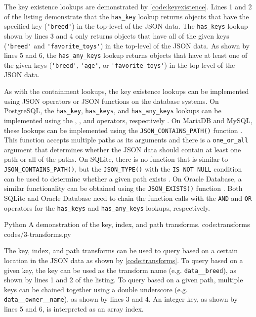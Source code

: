 The key existence lookups are demonstrated by \autoref{code:keyexistence}.
Lines 1 and 2 of the listing demonstrate that the \verb|has_key| lookup
returns objects that have the specified key (\verb|'breed'|) in the top-level
of the JSON data. The \verb|has_keys| lookup shown by lines 3 and 4 only
returns objects that have all of the given keys (\verb|'breed'| and
\verb|'favorite_toys'|) in the top-level of the JSON data. As shown by lines 5
and 6, the \verb|has_any_keys| lookup returns objects that have at least one
of the given keys (\verb|'breed'|, \verb|'age'|, or \verb|'favorite_toys'|) in
the top-level of the JSON data.

As with the containment lookups, the key existence lookups can be implemented
using JSON operators or JSON functions on the database systems. On PostgreSQL,
the \verb|has_key|, \verb|has_keys|, and \verb|has_any_keys| lookups can be
implemented using the , , and  operators,
respectively \cite{postgres:json_operators}. On MariaDB and MySQL, these
lookups can be implemented using the \verb|JSON_CONTAINS_PATH()| function
\cite{mariadb:json_contains_path, mysql:json_search}. This function accepts
multiple paths as its arguments and there is a \verb|one_or_all| argument that
determines whether the JSON data should contain at least one path or all of the
paths. On SQLite, there is no function that is similar to
\verb|JSON_CONTAINS_PATH()|, but the \verb|JSON_TYPE()| with the
\verb|IS NOT NULL| condition can be used to determine whether a given path
exists \cite{sqlite:json1}. On Oracle Database, a similar functionality can be
obtained using the \verb|JSON_EXISTS()| function \cite{oracle:json_exists}. Both
SQLite and Oracle Database need to chain the function calls with the \verb|AND|
and \verb|OR| operators for the \verb|has_keys| and \verb|has_any_keys|
lookups, respectively.

\listing
{Python}
{A demonstration of the key, index, and path transforms.}
{code:transforms}
{codes/3-transforms.py}

The key, index, and path transforms can be used to query based on a certain
location in the JSON data as shown by \autoref{code:transforms}. To query based
on a given key, the key can be used as the transform name (e.g.
\verb|data__breed|), as shown by lines 1 and 2 of the listing. To query based
on a given path, multiple keys can be chained together using a double
underscore (e.g. \verb|data__owner__name|), as shown by lines 3 and 4. An
integer key, as shown by lines 5 and 6, is interpreted as an array index.

